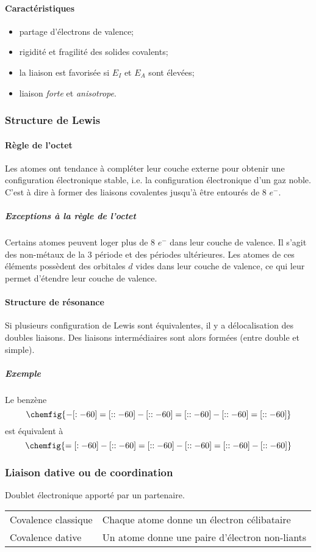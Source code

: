 \paragraph{Caractéristiques}
\begin{itemize}
  \item partage d'électrons de valence;
  \item rigidité et fragilité des solides covalents;
  \item la liaison est favorisée si $E_I$ et $E_A$ sont élevées;
  \item liaison \emph{forte} et \emph{anisotrope}.
\end{itemize}
\subsubsection{Structure de Lewis}
\paragraph{Règle de l'octet}
Les atomes ont tendance à compléter leur couche externe pour obtenir une configuration électronique stable,
i.e. la configuration électronique d'un gaz noble.
C'est à dire à former des liaisons covalentes jusqu'à être entourés de 8 $e^-$.
\subparagraph{Exceptions à la règle de l'octet}
Certains atomes peuvent loger plus de 8 $e^-$ dans leur couche de valence. Il s'agit des non-métaux de la 3
période et des périodes ultérieures. Les atomes de ces éléments possèdent des orbitales $d$ vides dans leur couche
de valence, ce qui leur permet d'étendre leur couche de valence.

\paragraph{Structure de résonance}
Si plusieurs configuration de Lewis sont équivalentes,
il y a délocalisation des doubles liaisons.
Des liaisons intermédiaires sont alors formées (entre double et simple).
\subparagraph{Exemple} Le benzène
$$\chemfig{-[:-60]=[::-60]-[::-60]=[::-60]-[::-60]=[::-60]}$$ est équivalent à $$\chemfig{=[:-60]-[::-60]=[::-60]-[::-60]=[::-60]-[::-60]}$$

\subsubsection{Liaison dative ou de coordination}
Doublet électronique apporté par un partenaire.

\begin{center}
  \begin{tabular}{ll}
    Covalence classique & Chaque atome donne un électron célibataire\\
    Covalence dative & Un atome donne une paire d'électron non-liants
  \end{tabular}
\end{center}

